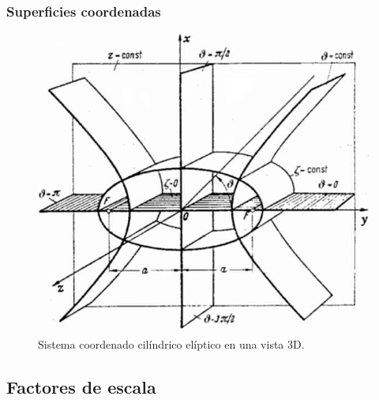 \documentclass[12pt]{beamer}
\begin{document}
\begin{frame}
\frametitle{Superficies coordenadas}
\begin{figure}[H]
    \centering
    \includegraphics[scale=0.3]{Imagenes/Elliptic-cylindrical-coordinates_02.png}
    \caption{Sistema coordenado cilíndrico elíptico en una vista 3D.}
    \label{fig:figura_coordenada_cilindricas_elipticas_3D}
\end{figure}
\end{frame}

\subsection{Factores de escala}
\end{document}
